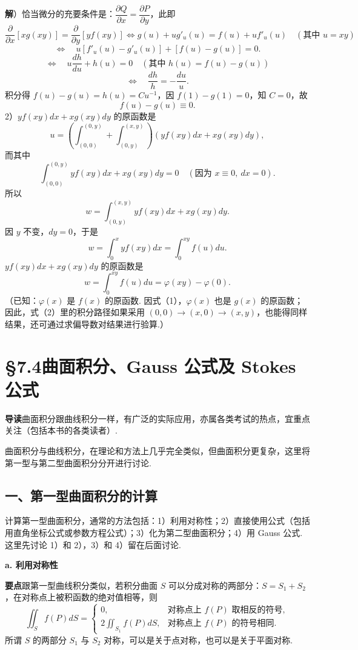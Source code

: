 \documentclass[UTF8,12pt,a4paper,fontset=fandol]{ctexart}
\begin{document}
\noindent\textbf{解}）恰当微分的充要条件是：$\dfrac{\partial Q}{\partial x}=\dfrac{\partial P}{\partial y}$，此即
\[
\frac{\partial}{\partial x}[xg(xy)]
=\frac{\partial}{\partial y}[yf(xy)]
\Longleftrightarrow
g(u)+ug'_u(u)=f(u)+uf'_u(u)\quad(\text{其中 }u=xy)
\]
\[
\Longleftrightarrow\quad
u[f'_u(u)-g'_u(u)]+[f(u)-g(u)]=0.
\]
\[
\Longleftrightarrow\quad
u\frac{dh}{du}+h(u)=0\quad(\text{其中 }h(u)=f(u)-g(u))
\]
\[
\Longleftrightarrow\quad
\frac{dh}{h}=-\frac{du}{u}.
\]
积分得 $f(u)-g(u)=h(u)=Cu^{-1}$，因 $f(1)-g(1)=0$，知 $C=0$，故
\[
f(u)-g(u)\equiv0.
\tag{1}
\]
2）$yf(xy)dx+xg(xy)dy$ 的原函数是
\[
u=\left(\int_{(0,0)}^{(0,y)}+\int_{(0,y)}^{(x,y)}\right)
(yf(xy)dx+xg(xy)dy),
\tag{2}
\]
而其中
\[
\int_{(0,0)}^{(0,y)}yf(xy)dx+xg(xy)dy=0\quad(\text{因为 }x\equiv0,\ dx=0).
\]
所以
\[
w=\int_{(0,y)}^{(x,y)}yf(xy)dx+xg(xy)dy.
\]
因 $y$ 不变，$dy=0$，于是
\[
w=\int_0^xyf(xy)dx=\int_0^{xy}f(u)du.
\]
$yf(xy)dx+xg(xy)dy$ 的原函数是
\[
w=\int_0^{xy}f(u)du=\varphi(xy)-\varphi(0).
\]
（已知：$\varphi(x)$ 是 $f(x)$ 的原函数. 因式（1），$\varphi(x)$ 也是 $g(x)$ 的原函数；因此，式（2）里的积分路径如果采用 $(0,0)\to(x,0)\to(x,y)$，也能得同样结果，还可通过求偏导数对结果进行验算.）

\section*{§7.4\quad 曲面积分、Gauss 公式及 Stokes 公式}

\noindent\textbf{导读}\quad 曲面积分跟曲线积分一样，有广泛的实际应用，亦属各类考试的热点，宜重点关注（包括本书的各类读者）.

曲面积分与曲线积分，在理论和方法上几乎完全类似，但曲面积分更复杂，这里将第一型与第二型曲面积分分开进行讨论.

\subsection*{一、第一型曲面积分的计算}

计算第一型曲面积分，通常的方法包括：1）利用对称性；2）直接使用公式（包括用直角坐标公式或参数方程公式）；3）化为第二型曲面积分；4）用 Gauss 公式. 这里先讨论 1）和 2），3）和 4）留在后面讨论.

\noindent\textbf{a. 利用对称性}

\noindent\textbf{要点}\quad 跟第一型曲线积分类似，若积分曲面 $S$ 可以分成对称的两部分：$S=S_1+S_2$，在对称点上被积函数的绝对值相等，则
\[
\iint_Sf(P)dS=
\begin{cases}
0, & \text{对称点上 }f(P)\text{ 取相反的符号},\\
2\iint_{S_1}f(P)dS, & \text{对称点上 }f(P)\text{ 的符号相同}.
\end{cases}
\]
所谓 $S$ 的两部分 $S_1$ 与 $S_2$ 对称，可以是关于点对称，也可以是关于平面对称.
\end{document}
